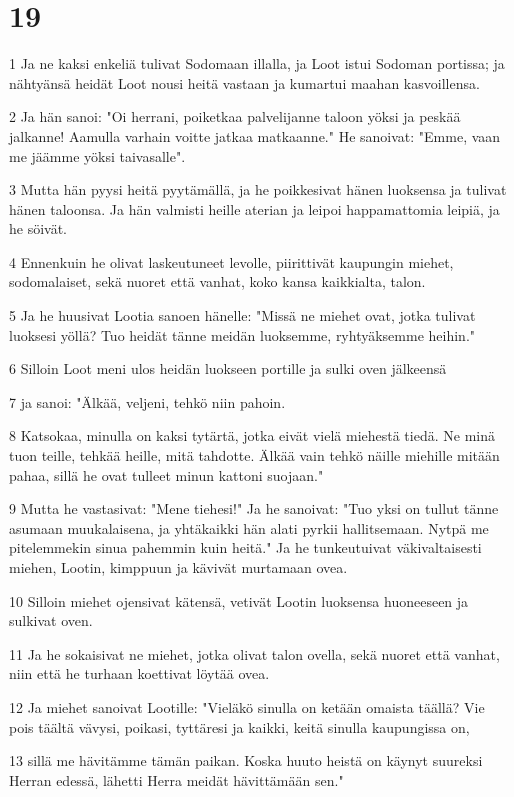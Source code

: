 \chapter{19}

\par 1 Ja ne kaksi enkeliä tulivat Sodomaan illalla, ja Loot istui Sodoman portissa; ja nähtyänsä heidät Loot nousi heitä vastaan ja kumartui maahan kasvoillensa.
\par 2 Ja hän sanoi: "Oi herrani, poiketkaa palvelijanne taloon yöksi ja peskää jalkanne! Aamulla varhain voitte jatkaa matkaanne." He sanoivat: "Emme, vaan me jäämme yöksi taivasalle".
\par 3 Mutta hän pyysi heitä pyytämällä, ja he poikkesivat hänen luoksensa ja tulivat hänen taloonsa. Ja hän valmisti heille aterian ja leipoi happamattomia leipiä, ja he söivät.
\par 4 Ennenkuin he olivat laskeutuneet levolle, piirittivät kaupungin miehet, sodomalaiset, sekä nuoret että vanhat, koko kansa kaikkialta, talon.
\par 5 Ja he huusivat Lootia sanoen hänelle: "Missä ne miehet ovat, jotka tulivat luoksesi yöllä? Tuo heidät tänne meidän luoksemme, ryhtyäksemme heihin."
\par 6 Silloin Loot meni ulos heidän luokseen portille ja sulki oven jälkeensä
\par 7 ja sanoi: "Älkää, veljeni, tehkö niin pahoin.
\par 8 Katsokaa, minulla on kaksi tytärtä, jotka eivät vielä miehestä tiedä. Ne minä tuon teille, tehkää heille, mitä tahdotte. Älkää vain tehkö näille miehille mitään pahaa, sillä he ovat tulleet minun kattoni suojaan."
\par 9 Mutta he vastasivat: "Mene tiehesi!" Ja he sanoivat: "Tuo yksi on tullut tänne asumaan muukalaisena, ja yhtäkaikki hän alati pyrkii hallitsemaan. Nytpä me pitelemmekin sinua pahemmin kuin heitä." Ja he tunkeutuivat väkivaltaisesti miehen, Lootin, kimppuun ja kävivät murtamaan ovea.
\par 10 Silloin miehet ojensivat kätensä, vetivät Lootin luoksensa huoneeseen ja sulkivat oven.
\par 11 Ja he sokaisivat ne miehet, jotka olivat talon ovella, sekä nuoret että vanhat, niin että he turhaan koettivat löytää ovea.
\par 12 Ja miehet sanoivat Lootille: "Vieläkö sinulla on ketään omaista täällä? Vie pois täältä vävysi, poikasi, tyttäresi ja kaikki, keitä sinulla kaupungissa on,
\par 13 sillä me hävitämme tämän paikan. Koska huuto heistä on käynyt suureksi Herran edessä, lähetti Herra meidät hävittämään sen."
